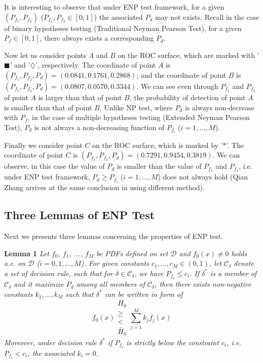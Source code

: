 It is interesting to observe that under ENP test framework, for a given $(P_{f_1}, P_{f_2})$  ($P_{f_1}, P_{f_2}\in [0, 1]$) the associated $P_d$ may not exists. 
Recall in the case of binary hypotheses testing (Traditional Neyman Pearson Test), for a given $P_f \in [0, 1]$, there always exists a corresponding $P_d$. 

Now let us consider points $A$ and $B$ on the ROC surface, which are marked with '$\blacksquare$' and '$\diamondsuit$', respectively.  The coordinate of point $A$ is $(P_{f_1}, P_{f_2}, P_d) = (0.0841, 0.1761, 0.2868)$; and the coordinate of point $B$ is  $(P_{f_1}, P_{f_2}, P_d) = (0.0807, 0.0570, 0.3344)$. We can see even through $P_{f_1}$ and $P_{f_2}$ of point $A$ is larger than that of point $B$, the probability of detection of point $A$ is  smaller than that of point $B$.  
Unlike NP test, where $P_d$ is always non-decrease with $P_f$, in the case of multiple hypotheses testing (Extended Neyman Pearson Test), $P_d$ is not always a non-decreasing function of  $P_{f_i}$ ($i=1, ..., M$).

Finally we consider point $C$ on the ROC surface, which is marked by '$\ast$'. The coordinate of point $C$ is $(P_{f_1}, P_{f_2}, P_d) = (0.7291, 0.9454, 0.3819)$. We can observe, in this case the value of $P_d$ is smaller than the value of $P_{f_1}$ and $P_{f_2}$, i.e. under ENP test framework, $P_d \geq P_{f_i}$  ($i = 1, ..., M$) does not always hold (Qian Zhang arrives at the same conclusion in  \cite{zhang1999design, zhang2000efficient} using different method). 

\subsection{Three Lemmas of ENP Test}

Next we presents three lemmas concerning the properties of ENP test.

\noindent \textbf{Lemma 1}
\noindent \textit{
Let $f_0$, $f_1$, ..., $f_M$ be PDFs defined on set $\mathcal{D}$ and $f_0(x) \neq 0$ holds a.e. on $\mathcal{D}$ ($i=0, 1,..., M$). For given constants $c_1, ..., c_M \in (0, 1)$, let $\mathcal{C}_\delta$ denote a set of decision rule,  such that for $\delta \in \mathcal{C}_\delta$, we have $P_{f_i} \leq c_i$.
If  $\delta^{\ast}$ is a member of $\mathcal{C}_\delta$ and it maximize $P_d$ among all members of $\mathcal{C}_\delta$, then there exists non-negative constants $k_1, ..., k_M$ such that $\delta^\ast$ can be written in form of  
\begin{equation}
f_0(x) \substack{H_0 \\ \geq \\ < \\ \bar{H}_0} \sum_{j=1}^{M}k_jf_j(x)
\end{equation}
Moreover, under decision rule $\delta^\ast$ if $P_{f_i} $ is strictly  below the constraint $c_i$, i.e. $P_{f_i} < c_i$, the associated $k_i = 0$. 
}

